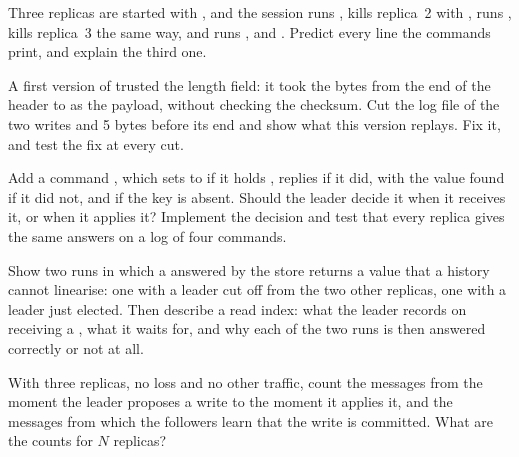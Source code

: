 \begin{exercise}[$\star$]\label{exo:b3:project-replicated-store:4}
Three replicas are started with , and the session runs , kills replica~2 with , runs , kills replica~3 the same way, and runs ,  and . Predict every line the commands print, and explain the third one.
\end{exercise}

\begin{exercise}[$\star\star$]\label{exo:b3:project-replicated-store:5}
A first version of  trusted the length field: it took the bytes from the end of the header to  as the payload, without checking the checksum. Cut the log file of the two writes  and  5 bytes before its end and show what this version replays. Fix it, and test the fix at every cut.
\end{exercise}

\begin{exercise}[$\star\star$]\label{exo:b3:project-replicated-store:6}
Add a command , which sets  to  if it holds , replies  if it did,  with the value found if it did not, and  if the key is absent. Should the leader decide it when it receives it, or when it applies it? Implement the decision and test that every replica gives the same answers on a log of four commands.
\end{exercise}

\begin{exercise}[$\star\star$]\label{exo:b3:project-replicated-store:7}
Show two runs in which a  answered by the store returns a value that a history cannot linearise: one with a leader cut off from the two other replicas, one with a leader just elected. Then describe a read index: what the leader records on receiving a , what it waits for, and why each of the two runs is then answered correctly or not at all.
\end{exercise}

\begin{exercise}[$\star\star$]\label{exo:b3:project-replicated-store:8}
With three replicas, no loss and no other traffic, count the  messages from the moment the leader proposes a write to the moment it applies it, and the messages from which the followers learn that the write is committed. What are the counts for $N$ replicas?
\end{exercise}

